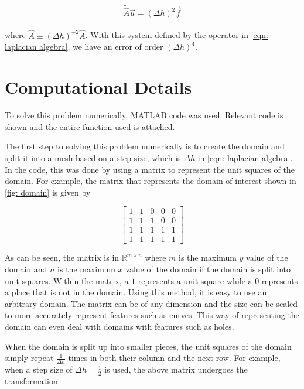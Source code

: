 \documentclass[10pt,a4paper]{article}
\begin{document}
\begin{equation}
\label{eqn: linear system 2}
\tilde{\hat{A}} \vec{u}  = \left( \Delta h \right)^2 \vec{f}
\end{equation}

 where $\tilde{\hat{A}} \equiv \left( \Delta h \right)^{-2} \hat{A}$. With this system defined by the operator in \cref{eqn: laplacian algebra}, we have an error of order $\left( \Delta h \right)^4$.

\section*{Computational Details}
To solve this problem numerically, MATLAB code was used. Relevant code is shown and the entire function used is attached.

The first step to solving this problem numerically is to create the domain and split it into a mesh based on a step size, which is $\Delta h$ in \cref{eqn: laplacian algebra}. In the code, this was done by using a matrix to represent the unit squares of the domain. For example, the matrix that represents the domain of interest shown in \cref{fig: domain} is given by

\begin{displaymath}
\left[
\begin{matrix}
1 & 1 & 0 & 0 & 0 \\
1 & 1 & 1 & 0 & 0 \\
1 & 1 & 1 & 1 & 1 \\
1 & 1 & 1 & 1 & 1
\end{matrix}
\right]
\end{displaymath}

As can be seen, the matrix is in $\mathbb{R}^{m \times n}$ where $m$ is the maximum $y$ value of the domain and $n$ is the maximum $x$ value of the domain if the domain is split into unit squares. Within the matrix, a $1$ represents a unit square while a $0$ represents a place that is not in the domain. Using this method, it is easy to use an arbitrary domain. The matrix can be of any dimension and the size can be scaled to more accurately represent features such as curves. This way of representing the domain can even deal with domains with features such as holes.

When the domain is split up into smaller pieces, the unit squares of the domain simply repeat $\frac{1}{\Delta h}$ times in both their column and the next row. For example, when a step size of $\Delta h = \frac{1}{2}$ is used, the above matrix undergoes the transformation
\end{document}
